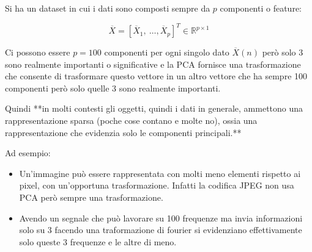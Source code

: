 Si ha un dataset in cui i dati sono composti sempre da $p$ componenti o feature:

$$
\overline{X}=\left[\overline{X}_1,\ \dots, \overline{X}_p\right]^T\in \mathbb{R}^{p\times1}
$$

Ci possono essere $p=100$ componenti per ogni singolo dato $\overline{X}(n)$ però solo 3 sono realmente importanti o significative e la PCA fornisce una trasformazione che consente di trasformare questo vettore in un altro vettore che ha sempre 100 componenti però solo quelle 3 sono realmente importanti.

Quindi **in molti contesti gli oggetti, quindi i dati in generale, ammettono una rappresentazione sparsa (poche cose contano e molte no), ossia una rappresentazione che evidenzia solo le componenti principali.**

Ad esempio:

\begin{itemize}[noitemsep, topsep=3pt]
  \item Un’immagine può essere rappresentata con molti meno elementi rispetto ai pixel, con un’opportuna trasformazione. Infatti la codifica JPEG non usa PCA però sempre una trasformazione.
  \item Avendo un segnale che può lavorare su 100 frequenze ma invia informazioni solo su 3 facendo una traformazione di fourier si evidenziano effettivamente solo queste 3 frequenze e le altre di meno.
\end{itemize}




